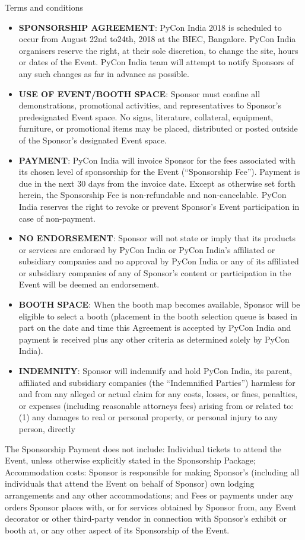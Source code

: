 \documentclass[10pt, compress, aspectratio=169]{beamer}
\begin{document}
\begin{frame}{Terms and conditions}
    \begin{tiny}
        \begin{itemize}
            \item \textbf{SPONSORSHIP AGREEMENT}: PyCon India 2018 is scheduled to occur from August 22nd to24th, 2018 at the BIEC, Bangalore. PyCon India organisers reserve the right, at their sole discretion, to change the site, hours or dates of the Event. PyCon India team will attempt to notify Sponsors of any such changes as far in advance as possible.
            \item \textbf{USE OF EVENT/BOOTH SPACE}: Sponsor must confine all demonstrations, promotional activities, and representatives to Sponsor’s predesignated Event space. No signs, literature, collateral, equipment, furniture, or promotional items may be placed, distributed or posted outside of the Sponsor’s designated Event space.
            \item \textbf{PAYMENT}: PyCon India will invoice Sponsor for the fees associated with its chosen level of sponsorship for the Event (“Sponsorship Fee”). Payment is due in the next 30 days from the invoice date. Except as otherwise set forth herein, the Sponsorship Fee is non-refundable and non-cancelable. PyCon India reserves the right to revoke or prevent Sponsor’s Event participation in case of non-payment.
            \item \textbf{NO ENDORSEMENT}: Sponsor will not state or imply that its products or services are endorsed by PyCon India or PyCon India’s affiliated or subsidiary companies and no approval by PyCon India or any of its affiliated or subsidiary companies of any of Sponsor’s content or participation in the Event will be deemed an endorsement.
            \item \textbf{BOOTH SPACE}: When the booth map becomes available, Sponsor will be eligible to select a booth (placement in the booth selection queue is based in part on the date and time this Agreement is accepted by PyCon India and payment is received plus any other criteria as determined solely by PyCon India).
            \item \textbf{INDEMNITY}: Sponsor will indemnify and hold PyCon India, its parent, affiliated and subsidiary companies (the “Indemnified Parties”) harmless for and from any alleged or actual claim for any costs, losses, or fines, penalties, or expenses (including reasonable attorneys fees) arising from or related to: (1) any damages to real or personal property, or personal injury to any person, directly
        \end{itemize}
        The Sponsorship Payment does not include:  Individual tickets to attend the Event, unless otherwise explicitly stated in the Sponsorship Package; Accommodation costs: Sponsor is responsible for making Sponsor’s (including all individuals that attend the Event on behalf of Sponsor) own lodging arrangements and any other accommodations; and
        Fees or payments under any orders Sponsor places with, or for services obtained by Sponsor from, any Event decorator or other third-party vendor in connection with Sponsor’s exhibit or booth at, or any other aspect of its Sponsorship of the Event.


\end{tiny}
\end{frame}
\end{document}
